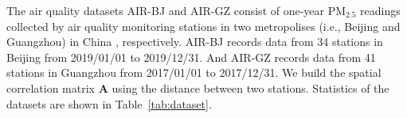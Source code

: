 {\begin{table}[htbp]
    \caption{Details of all datasets.}
    \centering
    \vspace{-1em}
    \setlength \tabcolsep{3pt}
	\label{tab:dataset}
\end{table}

\par The air quality datasets AIR-BJ and AIR-GZ consist of one-year PM$_{2.5}$ readings collected by air quality monitoring stations in two metropolises (i.e., Beijing and Guangzhou) in China \cite{yi2018deep}, respectively. AIR-BJ records data from 34 stations in Beijing from 2019/01/01 to 2019/12/31. And AIR-GZ records data from 41 stations in Guangzhou from 2017/01/01 to 2017/12/31. We build the spatial correlation matrix $\mathbf A$ using the distance between two stations. Statistics of the datasets are shown in Table~\ref{tab:dataset}. 

}

